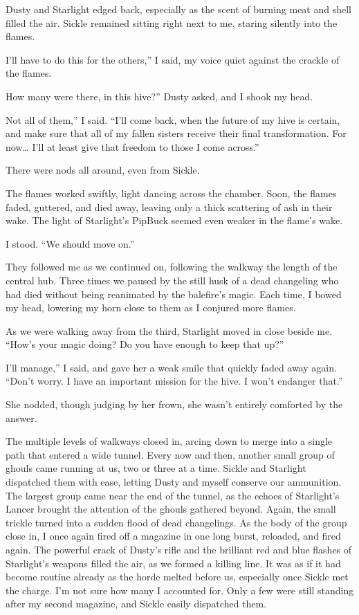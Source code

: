 Dusty and Starlight edged back, especially as the scent of burning meat and shell filled the air. Sickle remained sitting right next to me, staring silently into the flames.

\leavevmode{}I’ll have to do this for the others,” I said, my voice quiet against the crackle of the flames.

\leavevmode{}How many were there, in this hive?” Dusty asked, and I shook my head.

\leavevmode{}Not all of them,” I said. “I’ll come back, when the future of my hive is certain, and make sure that all of my fallen sisters receive their final transformation. For now… I’ll at least give that freedom to those I come across.”

There were nods all around, even from Sickle.

The flames worked swiftly, light dancing across the chamber. Soon, the flames faded, guttered, and died away, leaving only a thick scattering of ash in their wake. The light of Starlight’s PipBuck seemed even weaker in the flame’s wake.

I stood. “We should move on.”

They followed me as we continued on, following the walkway the length of the central hub. Three times we paused by the still husk of a dead changeling who had died without being reanimated by the balefire’s magic. Each time, I bowed my head, lowering my horn close to them as I conjured more flames.

As we were walking away from the third, Starlight moved in close beside me. “How’s your magic doing? Do you have enough to keep that up?”

\leavevmode{}I’ll manage,” I said, and gave her a weak smile that quickly faded away again. “Don’t worry. I have an important mission for the hive. I won’t endanger that.”

She nodded, though judging by her frown, she wasn’t entirely comforted by the answer.

The multiple levels of walkways closed in, arcing down to merge into a single path that entered a wide tunnel. Every now and then, another small group of ghouls came running at us, two or three at a time. Sickle and Starlight dispatched them with ease, letting Dusty and myself conserve our ammunition. The largest group came near the end of the tunnel, as the echoes of Starlight’s Lancer brought the attention of the ghouls gathered beyond. Again, the small trickle turned into a sudden flood of dead changelings. As the body of the group close in, I once again fired off a magazine in one long burst, reloaded, and fired again. The powerful crack of Dusty’s rifle and the brilliant red and blue flashes of Starlight’s weapons filled the air, as we formed a killing line. It was as if it had become routine already as the horde melted before us, especially once Sickle met the charge. I’m not sure how many I accounted for. Only a few were still standing after my second magazine, and Sickle easily dispatched them.

